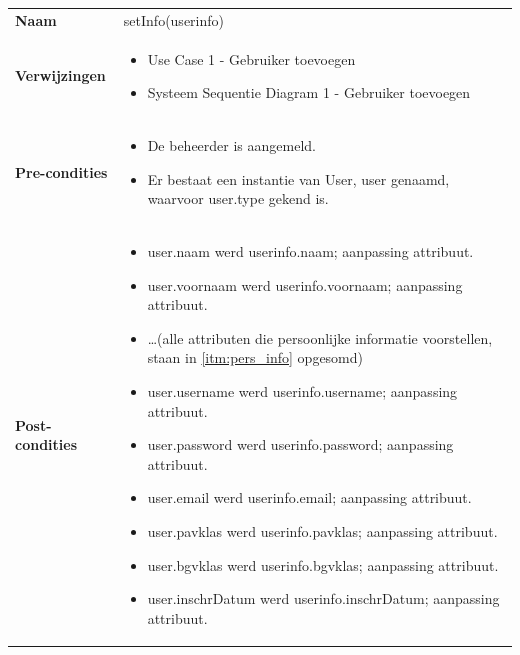 \documentclass[a4paper]{article}
\begin{document}
\begin{tabularx}{\textwidth}{|l X|}
    \hline
    \textbf{Naam} & setInfo(userinfo) \\
    \textbf{Verwijzingen} & \begin{itemize}[leftmargin=*]
        \item Use Case 1 - Gebruiker toevoegen
        \item Systeem Sequentie Diagram 1 - Gebruiker toevoegen
    \end{itemize}\\
    \textbf{Pre-condities} & \begin{itemize}[leftmargin=*]
        \item De beheerder is aangemeld.
        \item Er bestaat een instantie van User, user genaamd, waarvoor user.type gekend is.
    \end{itemize}\\
    \textbf{Post-condities} & \begin{itemize}[leftmargin=*]
        \item user.naam werd userinfo.naam; aanpassing attribuut.
        \item user.voornaam werd userinfo.voornaam; aanpassing attribuut.
        \item \dots  (alle attributen die persoonlijke informatie voorstellen, staan in \ref{itm:pers_info} opgesomd)
        \item user.username werd userinfo.username; aanpassing attribuut.
        \item user.password werd userinfo.password; aanpassing attribuut.
        \item user.email werd userinfo.email; aanpassing attribuut.
        \item user.pavklas werd userinfo.pavklas; aanpassing attribuut.
        \item user.bgvklas werd userinfo.bgvklas; aanpassing attribuut.
        \item user.inschrDatum werd userinfo.inschrDatum; aanpassing attribuut.
    \end{itemize}\\
    \hline
\end{tabularx}\\

\end{document}
